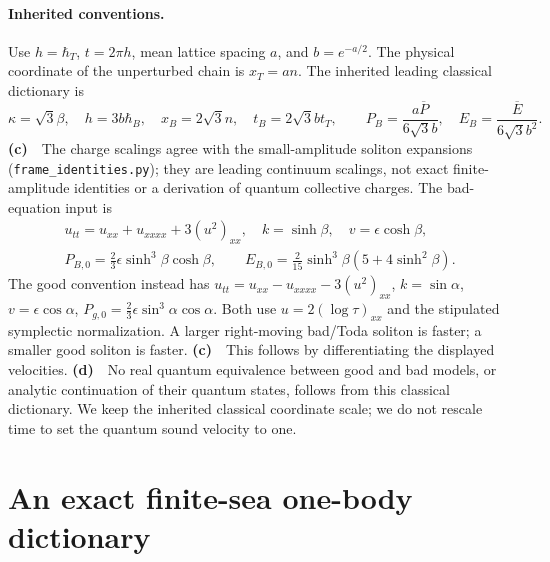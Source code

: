 \documentclass[11pt,a4paper]{article}
\newcommand{\Lc}{\textbf{(c)}\ }
\newcommand{\Ld}{\textbf{(d)}\ }
\newcommand{\id}{\texttt{frame\_\allowbreak identities.py}}
\begin{document}
\paragraph{Inherited conventions.}
Use $h=\hbar_T$, $t=2\pi h$, mean lattice spacing $a$, and $b=e^{-a/2}$.
The physical coordinate of the unperturbed chain is $x_T=an$.
The inherited leading classical dictionary is
\begin{equation}
 \kappa=\sqrt3\beta,\quad h=3b\hbar_B,\quad
 x_B=2\sqrt3 n,\quad t_B=2\sqrt3 b t_T,\qquad
 P_B=\frac{a\overline P}{6\sqrt3 b},\quad
 E_B=\frac{\overline E}{6\sqrt3 b^2}.
 \label{eq:units}
\end{equation}
\Lc\ The charge scalings agree with the small-amplitude soliton expansions
(\id); they are leading continuum scalings, not exact finite-amplitude
identities or a derivation of quantum collective charges.
The bad-equation input is
\[
 \begin{gathered}
 u_{tt}=u_{xx}+u_{xxxx}+3(u^2)_{xx},\quad k=\sinh\beta,\quad v=\epsilon\cosh\beta,\\
 P_{B,0}=\tfrac23\epsilon\sinh^3\beta\cosh\beta,\qquad
 E_{B,0}=\tfrac2{15}\sinh^3\beta(5+4\sinh^2\beta).
 \end{gathered}
\]
The good convention instead has $u_{tt}=u_{xx}-u_{xxxx}-3(u^2)_{xx}$,
$k=\sin\alpha$, $v=\epsilon\cos\alpha$,
$P_{g,0}=\frac23\epsilon\sin^3\alpha\cos\alpha$.
Both use $u=2(\log\tau)_{xx}$ and the stipulated symplectic normalization.
A larger right-moving bad/Toda soliton is faster; a smaller good soliton is
faster. \Lc\ This follows by differentiating the displayed velocities.
\Ld\ No real quantum equivalence between good and bad models, or analytic
continuation of their quantum states, follows from this classical dictionary.
We keep the inherited classical coordinate scale; we do not rescale time to
set the quantum sound velocity to one.

\section{An exact finite-sea one-body dictionary}
\end{document}
